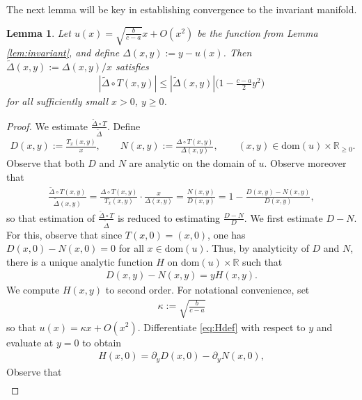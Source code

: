 \documentclass{article}
\newcommand{\RB}{\mathbb{R}}
\theoremstyle{plain}
\newtheorem{lemma}[theorem]{Lemma}
\theoremstyle{definition}
\theoremstyle{remark}
\begin{document}
The next lemma will be key in establishing convergence to the invariant manifold.

\begin{lemma}\label{lem:technical1}
    Let $u(x) = \sqrt{\frac{b}{c-a}}x+O(x^2)$ be the function from Lemma \ref{lem:invariant}, and define $\Delta(x,y):=y-u(x)$. Then $\widetilde{\Delta}(x,y):=\Delta(x,y)/x$ satisfies
    \begin{align}
        |\widetilde{\Delta}\circ T(x,y)|\leq |\widetilde{\Delta}(x,y)|\bigg(1-\frac{c-a}{2}y^2\bigg)
    \end{align}
    for all sufficiently small $x>0$, $y\geq 0$.
\end{lemma}

\begin{proof}
    We estimate $\frac{\widetilde{\Delta}\circ T}{\widetilde{\Delta}}$. Define
    \begin{align}
        D(x,y):=\frac{T_x(x,y)}{x},\qquad N(x,y):=\frac{\Delta\circ T(x,y)}{\Delta(x,y)},\qquad (x,y)\in\text{dom}(u)\times\RB_{\geq 0}.
    \end{align}
    Observe that both $D$ and $N$ are analytic on the domain of $u$. Observe moreover that
    \begin{align}
        \frac{\widetilde{\Delta}\circ T(x,y)}{\widetilde{\Delta}(x,y)} = \frac{\Delta\circ T(x,y)}{T_x(x,y)}\cdot \frac{x}{\Delta(x,y)} = \frac{N(x,y)}{D(x,y)} = 1-\frac{D(x,y)-N(x,y)}{D(x,y)},
    \end{align}
    so that estimation of $\frac{\widetilde{\Delta}\circ T}{\widetilde{\Delta}}$ is reduced to estimating $\frac{D-N}{D}$. We first estimate $D-N$. For this, observe that since $T(x,0) = (x,0)$, one has $D(x,0) - N(x,0) = 0$ for all $x\in\text{dom}(u)$. Thus, by analyticity of $D$ and $N$, there is a unique analytic function $H$ on $\text{dom}(u)\times\RB$ such that 
    \begin{align}\label{eq:Hdef}
        D(x,y) - N(x,y)= yH(x,y).
    \end{align}
    We compute $H(x,y)$ to second order. For notational convenience, set
    \begin{align}
        \kappa:=\sqrt{\frac{b}{c-a}}
    \end{align}
    so that $u(x) = \kappa x+O(x^2)$. Differentiate \eqref{eq:Hdef} with respect to $y$ and evaluate at $y=0$ to obtain
    \begin{align}
        H(x,0) = \partial_yD(x,0)-\partial_yN(x,0),
    \end{align}
    Observe that
    \begin{align}

\end{align}
\end{proof}
\end{document}
